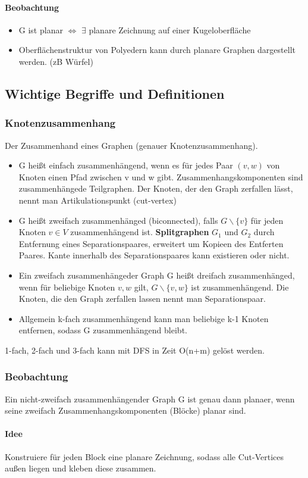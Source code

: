 \paragraph{Beobachtung}
\begin{itemize}
    \item  G ist planar $ \Leftrightarrow $ $ \exists $ planare Zeichnung auf einer Kugeloberfläche
    \item Oberflächenstruktur von Polyedern kann durch planare Graphen dargestellt werden. (zB Würfel)
\end{itemize}

\subsection{Wichtige Begriffe und Definitionen}
\subsubsection{Knotenzusammenhang}
Der Zusammenhand eines Graphen (genauer Knotenzusammenhang).
\begin{itemize}
    \item G heißt einfach zusammenhängend, wenn es für jedes Paar $ (v,w) $ von Knoten einen Pfad zwischen v und w gibt. Zusammenhangskomponenten sind zusammenhängede Teilgraphen. Der Knoten, der den Graph zerfallen lässt, nennt man Artikulationspunkt (cut-vertex)
    \item G heißt zweifach zusammenhänged (biconnected), falls $ G \backslash \{v\} $ für jeden Knoten $ v \in V $ zusammenhängend ist. \textbf{Splitgraphen} $ G_1 $ und $ G_2 $ durch Entfernung eines Separationspaares, erweitert um Kopieen des Entferten Paares. Kante innerhalb des Separationspaares kann existieren oder nicht.
    \item Ein zweifach zusammenhängeder Graph G heißt dreifach zusammenhänged, wenn für beliebige Knoten $ v,w $ gilt, $ G\backslash \{v,w\} $ ist zusammenhängend. Die Knoten, die den Graph zerfallen lassen nennt man Separationspaar.
    \item Allgemein k-fach zusammenhängend kann man beliebige k-1 Knoten entfernen, sodass G zusammenhängend bleibt.
\end{itemize}
1-fach, 2-fach und 3-fach kann mit DFS in Zeit O(n+m) gelöst werden.

\subsubsection{Beobachtung} Ein nicht-zweifach zusammenhängender Graph G ist genau dann planaer, wenn seine zweifach Zusammenhangskomponenten (Blöcke) planar sind. \paragraph{Idee}
Konstruiere für jeden Block eine planare Zeichnung, sodass alle Cut-Vertices außen liegen und kleben diese zusammen.

